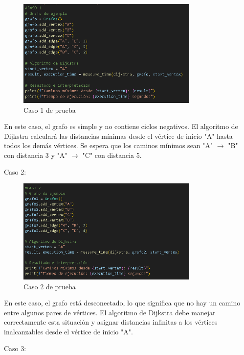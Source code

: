 \documentclass{article}
\begin{document}
\begin{figure}[H]
    \centering
    \includegraphics[width=0.8\textwidth]{figura_4_caso_1.PNG}
    \caption{Caso 1 de prueba}
    \label{figura 4}
\end{figure}
En este caso, el grafo es simple y no contiene ciclos negativos. 
El algoritmo de Dijkstra calculará las distancias mínimas desde el vértice 
de inicio "A" hasta todos los demás vértices. Se espera que los caminos 
mínimos sean "A" $\to$ "B" con distancia 3 y "A" $\to$ "C" con distancia 5.

Caso 2:

\begin{figure}[H]
    \centering
    \includegraphics[width=0.8\textwidth]{figura_5_caso_2.PNG}
    \caption{Caso 2 de prueba}
    \label{figura 5}
\end{figure}
En este caso, el grafo está desconectado, lo que significa 
que no hay un camino entre algunos pares de vértices. El algoritmo de 
Dijkstra debe manejar correctamente esta situación y asignar distancias 
infinitas a los vértices inalcanzables desde el vértice de inicio "A".

Caso 3:
\end{document}
